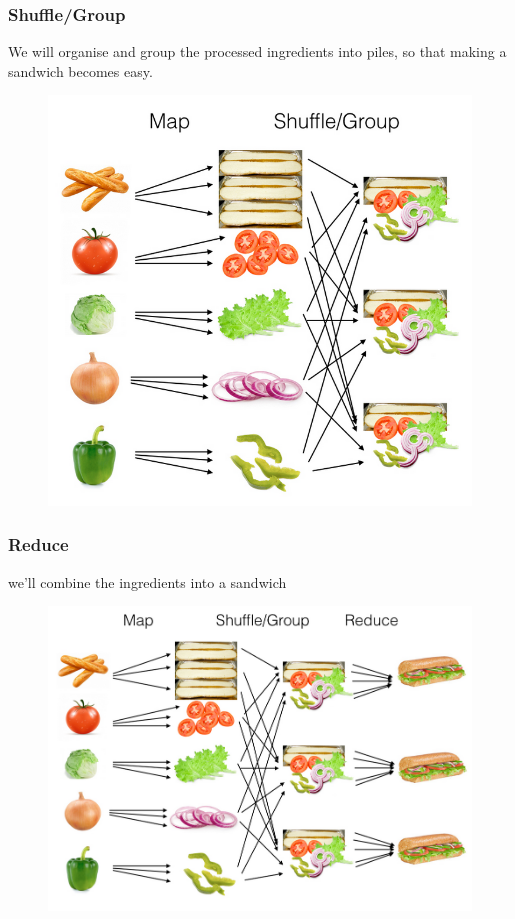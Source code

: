 \begin{frame}
	\frametitle{Shuffle/Group}
	We will organise and group the processed ingredients into piles, so that making a sandwich becomes easy.
		\begin{figure}
		\includegraphics[width=.7\textwidth,height=.64\textheight]{./Figures/chapter-02/map-reduce-shuffle.png}
	\end{figure}			
\end{frame}
\begin{frame}
	\frametitle{Reduce}
	we’ll combine the ingredients into a sandwich
	\begin{figure}
		\includegraphics[width=.96\textwidth,height=.7\textheight]{./Figures/chapter-02/map-reduce-reduce-side.png}
	\end{figure}			
\end{frame}


